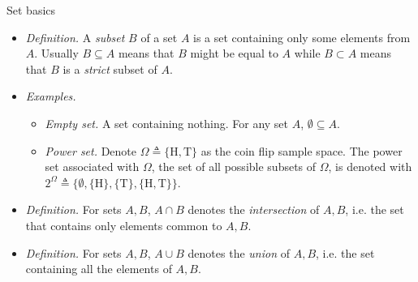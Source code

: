 \documentclass{beamer}
\numberwithin{equation}{section}
\begin{document}
\begin{frame}{Set basics}
    \begin{itemize}
        \item
        \textit{Definition.} A \textit{subset} $ B $ of a set $ A $ is a set
        containing only some elements from $ A $. Usually $ B \subseteq A $
        means that $ B $ might be equal to $ A $ while $ B \subset A $ means
        that $ B $ is a \textit{strict} subset of $ A $.

        \item
        \textit{Examples.}
        \begin{itemize}
            \item
            \textit{Empty set.} A set containing nothing. For any set $ A $,
            $ \emptyset \subseteq A $.

            \item
            \textit{Power set.} Denote $ \Omega \triangleq \{\text{H},
            \text{T}\} $ as the coin flip sample space. The power set
            associated with $ \Omega $, the set of all possible subsets of
            $ \Omega $, is denoted with $ 2^\Omega \triangleq \{\emptyset,
            \{\text{H}\}, \{\text{T}\}, \{\text{H}, \text{T}\}\} $.
        \end{itemize}

        \item
        \textit{Definition.} For sets $ A, B $, $ A \cap B $ denotes the 
        \textit{intersection} of $ A, B $, i.e. the set that contains only
        elements common to $ A, B $.

        \item
        \textit{Definition.} For sets $ A, B $, $ A \cup B $ denotes the
        \textit{union} of $ A, B $, i.e. the set containing all the elements
        of $ A, B $.
    \end{itemize}
\end{frame}
\end{document}
